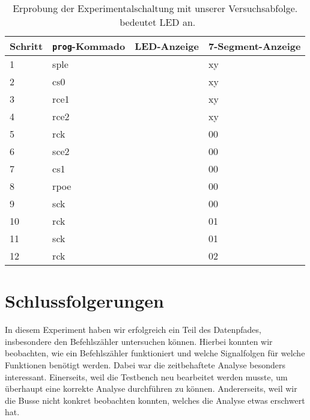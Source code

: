 \documentclass[12pt,a4paper]{scrartcl}
\begin{document}
\newcommand{\off}{\fullmoon}
\newcommand{\on}{\newmoon}

\begin{table}[h]
    \centering
    \caption{Erprobung der Experimentalschaltung mit unserer Versuchsabfolge.
    \on\ bedeutet LED an.}
    \begin{tabular}{l|l|l|l}
    \hline
    Schritt & \texttt{prog}-Kommado & LED-Anzeige  & 7-Segment-Anzeige \\
    \hline
    1  & sple & \on  \on  \on  \on   \off \off \off \on            & xy \\
    2  & cs0  & \on  \on  \on  \on   \off \off \off \on            & xy \\
    3  & rce1 & \on  \on  \on  \off  \off \off \off \on            & xy \\
    4  & rce2 & \on  \on  \off \off  \off \off \off \on            & xy \\
    5  & rck  & \on  \on  \off \off  \off \off \on  \off           & 00 \\
    6  & sce2 & \on  \on  \on  \off  \off \off \on  \off           & 00 \\
    7  & cs1  & \on  \on  \on  \off  \off \on  \on  \off           & 00 \\
    8  & rpoe & \off \on  \on  \off  \off \on  \on  \off           & 00 \\
    9  & sck  & \off \on  \on  \off  \off \on  \off \on            & 00 \\
    10 & rck  & \off \on  \on  \off  \off \on  \on  \off           & 01 \\
    11 & sck  & \off \on  \on  \off  \off \on  \off \on            & 01 \\
    12 & rck  & \off \on  \on  \off  \off \on  \on  \off           & 02 \\

    \hline
    \end{tabular}
    \label{erprobung}
\end{table}

\newpage

\section{Schlussfolgerungen}
In diesem Experiment haben wir erfolgreich ein Teil des Datenpfades, insbesondere den Befehlsz\"ahler untersuchen k\"onnen. Hierbei konnten wir beobachten, wie ein Befehlsz\"ahler funktioniert und welche Signalfolgen f\"ur welche Funktionen ben\"otigt werden. Dabei war die zeitbehaftete Analyse besonders interessant. Einerseits, weil die Testbench neu bearbeitet werden musste, um \"uberhaupt eine korrekte Analyse durchf\"uhren zu k\"onnen. Andererseits, weil wir die Busse nicht konkret beobachten konnten, welches die Analyse etwas erschwert hat.
\end{document}
